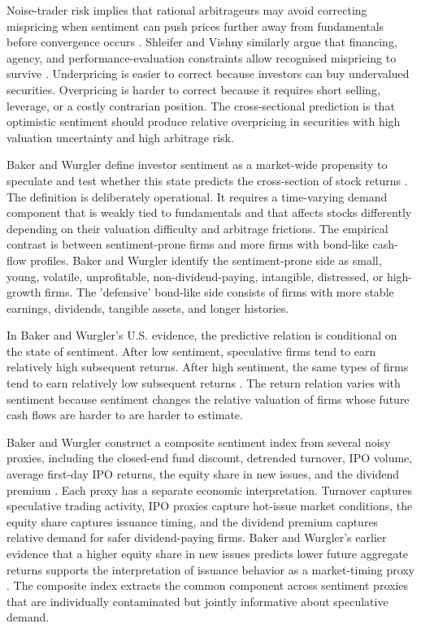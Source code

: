 \documentclass[11pt]{article}
\begin{document}
Noise-trader risk implies that rational arbitrageurs may avoid correcting mispricing when sentiment can push prices further away from fundamentals before convergence occurs \citep{delong1990noise}. Shleifer and Vishny similarly argue that financing, agency, and performance-evaluation constraints allow recognised mispricing to survive \citep{shleifer1997limits}. Underpricing is easier to correct because investors can buy undervalued securities. Overpricing is harder to correct because it requires short selling, leverage, or a costly contrarian position. The cross-sectional prediction is that optimistic sentiment should produce relative overpricing in securities with high valuation uncertainty and high arbitrage risk.

Baker and Wurgler define investor sentiment as a market-wide propensity to speculate and test whether this state predicts the cross-section of stock returns \citep{baker2006sentiment,baker2007}. The definition is deliberately operational. It requires a time-varying demand component that is weakly tied to fundamentals and that affects stocks differently depending on their valuation difficulty and arbitrage frictions. The empirical contrast is between sentiment-prone firms and more firms with bond-like cash-flow profiles. Baker and Wurgler identify the sentiment-prone side as small, young, volatile, unprofitable, non-dividend-paying, intangible, distressed, or high-growth firms. The 'defensive' bond-like side consists of firms with more stable earnings, dividends, tangible assets, and longer histories.

In Baker and Wurgler's U.S. evidence, the predictive relation is conditional on the state of sentiment. After low sentiment, speculative firms tend to earn relatively high subsequent returns. After high sentiment, the same types of firms tend to earn relatively low subsequent returns \citep{baker2006sentiment}. The return relation varies with sentiment because sentiment changes the relative valuation of firms whose future cash flows are harder to are harder to estimate.

Baker and Wurgler construct a composite sentiment index from several noisy proxies, including the closed-end fund discount, detrended turnover, IPO volume, average first-day IPO returns, the equity share in new issues, and the dividend premium \citep{baker2006sentiment,baker2007}. Each proxy has a separate economic interpretation. Turnover captures speculative trading activity, IPO proxies capture hot-issue market conditions, the equity share captures issuance timing, and the dividend premium captures relative demand for safer dividend-paying firms. Baker and Wurgler's earlier evidence that a higher equity share in new issues predicts lower future aggregate returns supports the interpretation of issuance behavior as a market-timing proxy \citep{baker2000equityshare}. The composite index extracts the common component across sentiment proxies that are individually contaminated but jointly informative about speculative demand.
\end{document}
